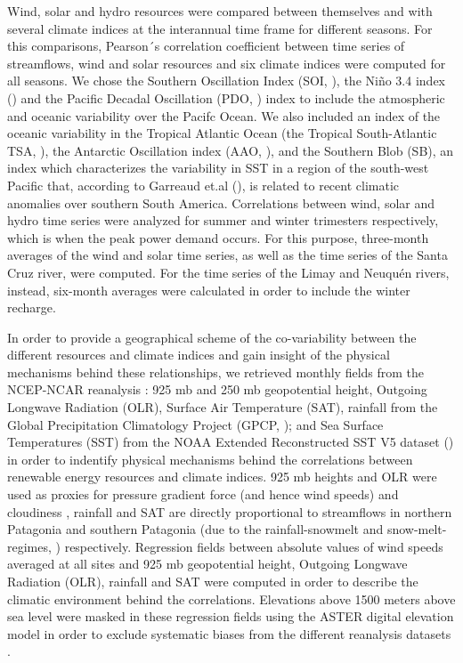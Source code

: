 \documentclass[AMA,Times1COL]{WileyNJDv5} %
\begin{document}
\begin{linenumbers}
Wind, solar and hydro resources were compared between themselves and with several climate indices at the interannual time frame for different seasons. For this comparisons, Pearson´s correlation coefficient between time series of streamflows, wind and solar resources and six climate indices were computed for all seasons. We chose the Southern Oscillation Index (SOI, \cite{ropelewski1987extension}), the Niño 3.4 index (\cite{rayner2003global}) and the Pacific Decadal Oscillation (PDO, \cite{mantua1997pacific}) index to include the atmospheric and oceanic variability over the Pacifc Ocean.  We also included an index of the oceanic variability in the Tropical Atlantic Ocean (the Tropical South-Atlantic TSA, \cite{enfield1999ubiquitous}), the Antarctic Oscillation index (AAO, \cite{mo2000relationships}), and the Southern Blob (SB), an index which characterizes the variability in SST in a region of the south-west Pacific that, according to Garreaud et.al (\cite{garreaud2021south}), is related to recent climatic anomalies over southern South America. Correlations between wind, solar and hydro time series were analyzed for summer and winter trimesters respectively, which is when the peak power demand occurs. For this purpose, three-month averages of the wind and solar time series, as well as the time series of the Santa Cruz river, were computed. For the time series of the Limay and Neuquén rivers, instead, six-month averages were calculated in order to include the winter recharge.

In order to provide a geographical scheme of the co-variability between the different resources and climate indices and gain insight of the physical mechanisms behind these relationships, we retrieved monthly fields from the NCEP-NCAR reanalysis \cite{kalnay2018ncep}: 925 mb and 250 mb geopotential height, Outgoing Longwave Radiation (OLR), Surface Air Temperature (SAT), rainfall from the Global Precipitation Climatology Project (GPCP, \cite{adler2003version}); and Sea Surface Temperatures (SST) from the NOAA Extended Reconstructed SST V5 dataset (\cite{huang2017noaa}) in order to indentify physical mechanisms behind the correlations between renewable energy resources and climate indices. 925 mb heights and OLR were used as proxies for pressure gradient force (and hence wind speeds) \cite{alonzo2020probabilistic} and cloudiness \cite{nyakwada1991relationships}, rainfall and SAT are directly proportional to streamflows in northern Patagonia and southern Patagonia (due to the rainfall-snowmelt and snow-melt-regimes, \cite{seoane2007assessing, pasquini2011southern}) respectively. Regression fields between absolute values of wind speeds averaged at all sites and 925 mb geopotential height, Outgoing Longwave Radiation (OLR), rainfall and SAT were computed in order to describe the climatic environment behind the correlations. Elevations above 1500 meters above sea level were masked in these regression fields using the ASTER digital elevation model \cite{abrams2010aster} in order to exclude systematic biases from the different reanalysis datasets \cite{gao2012elevation, birkel2022evaluation}.


\end{linenumbers}
\end{document}
